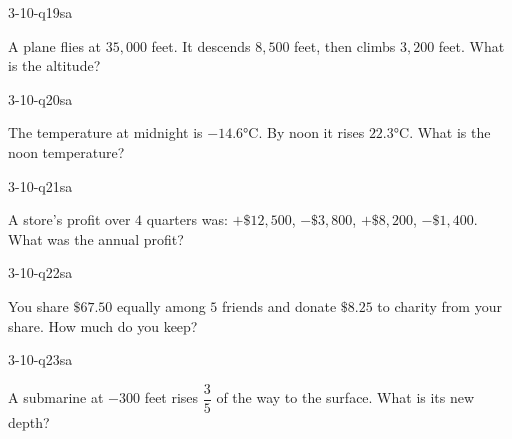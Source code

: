 
\begin{practiceQuestion}{3-10-q19}{sa}
\begin{questionText}
A plane flies at $35{,}000$ feet. It descends $8{,}500$ feet, then climbs $3{,}200$ feet. What is the altitude?
\end{questionText}
\end{practiceQuestion}

\begin{practiceQuestion}{3-10-q20}{sa}
\begin{questionText}
The temperature at midnight is $-14.6°$C. By noon it rises $22.3°$C. What is the noon temperature?
\end{questionText}
\end{practiceQuestion}

\begin{practiceQuestion}{3-10-q21}{sa}
\begin{questionText}
A store's profit over $4$ quarters was: $+\$12{,}500$, $-\$3{,}800$, $+\$8{,}200$, $-\$1{,}400$. What was the annual profit?
\end{questionText}
\end{practiceQuestion}

\begin{practiceQuestion}{3-10-q22}{sa}
\begin{questionText}
You share $\$67.50$ equally among $5$ friends and donate $\$8.25$ to charity from your share. How much do you keep?
\end{questionText}
\end{practiceQuestion}

\begin{practiceQuestion}{3-10-q23}{sa}
\begin{questionText}
A submarine at $-300$ feet rises $\dfrac{3}{5}$ of the way to the surface. What is its new depth?
\end{questionText}
\end{practiceQuestion}

